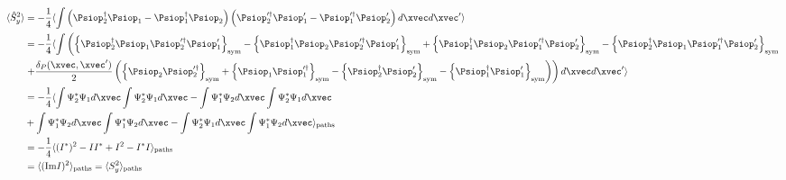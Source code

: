 \begin{equation*}
\begin{split}
	\langle \hat{S}^2_y \rangle
	& = - \frac{1}{4} \langle \int \left(
		\Psiop^\dagger_2 \Psiop_1 - \Psiop^\dagger_1 \Psiop_2
	\right)
	\left(
		\Psiop^{\prime\dagger}_2 \Psiop^\prime_1 - \Psiop^{\prime\dagger}_1 \Psiop^\prime_2
	\right) d\xvec d\xvec^\prime \rangle \\
	& = - \frac{1}{4} \langle \int \left(
		\symprod{ \Psiop^\dagger_2 \Psiop_1 \Psiop^{\prime\dagger}_2 \Psiop^\prime_1 }
		- \symprod{ \Psiop^\dagger_1 \Psiop_2 \Psiop^{\prime\dagger}_2 \Psiop^\prime_1 }
		+ \symprod{ \Psiop^\dagger_1 \Psiop_2 \Psiop^{\prime\dagger}_1 \Psiop^\prime_2 }
		- \symprod{ \Psiop^\dagger_2 \Psiop_1 \Psiop^{\prime\dagger}_1 \Psiop^\prime_2 }
	\right. \\
	& \left.
		+ \frac{\delta_P(\xvec,\xvec^\prime)}{2} \left(
			\symprod{ \Psiop_2 \Psiop^{\prime\dagger}_2 }
			+ \symprod{ \Psiop_1 \Psiop^{\prime\dagger}_1 }
			- \symprod{ \Psiop^\dagger_2 \Psiop^\prime_2 }
			- \symprod{ \Psiop^\dagger_1 \Psiop^\prime_1 }
		\right)
	\right) d\xvec d\xvec^\prime \rangle \\
	& = - \frac{1}{4} \pathavg{
		\int \Psi^*_2 \Psi_1 d\xvec \int \Psi^*_2 \Psi_1 d\xvec
		- \int \Psi^*_1 \Psi_2 d\xvec \int \Psi^*_2 \Psi_1 d\xvec \\
	&	+ \int \Psi^*_1 \Psi_2 d\xvec \int \Psi^*_1 \Psi_2 d\xvec
		- \int \Psi^*_2 \Psi_1 d\xvec \int \Psi^*_1 \Psi_2 d\xvec } \\
	& = - \frac{1}{4} \pathavg{ (I^*)^2 - I I^* + I^2 - I^* I } \\
	& = \pathavg{ ( \Imag I )^2 } = \pathavg{ S^2_y }
\end{split}
\end{equation*}

